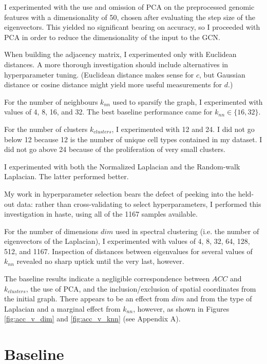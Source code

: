 \documentclass{article}
\newcommand{\nData}{1167}
\begin{document}
I experimented with the use and omission of PCA on the preprocessed genomic features with a dimensionality of 50, chosen after evaluating the step size of the eigenvectors. This yielded no significant bearing on accuracy, so I proceeded with PCA in order to reduce the dimensionality of the input to the GCN.

When building the adjacency matrix, I experimented only with Euclidean distances. A more thorough investigation should include alternatives in hyperparameter tuning. (Euclidean distance makes sense for $c$, but Gaussian distance or cosine distance might yield more useful measurements for $d$.)

For the number of neighbours $k_{nn}$ used to sparsify the graph, I experimented with values of 4, 8, 16, and 32. The best baseline performance came for $k_{nn} \in \{16,32\}$.

For the number of clusters $k_{clusters}$, I experimented with 12 and 24. I did not go below 12 because 12 is the number of unique cell types contained in my dataset. I did not go above 24 because of the proliferation of very small clusters.

I experimented with both the Normalized Laplacian and the Random-walk Laplacian. The latter performed better.

My work in hyperparameter selection bears the defect of peeking into the held-out data: rather than cross-validating to select hyperparameters, I performed this investigation in haste, using all of the \nData{} samples available.

For the number of dimensions $dim$ used in spectral clustering (i.e. the number of eigenvectors of the Laplacian), I experimented with values of 4, 8, 32, 64, 128, 512, and \nData{}. Inspection of distances between eigenvalues for several values of $k_{nn}$ revealed no sharp uptick until the very last, however.

The baseline results indicate a negligible correspondence between $ACC$ and $k_{clusters}$, the use of PCA, and the inclusion/exclusion of spatial coordinates from the initial graph. There appears to be an effect from $dim$ and from the type of Laplacian and a marginal effect from $k_{nn}$, however, as shown in Figures \ref{fig:acc_v_dim} and \ref{fig:acc_v_knn} (see Appendix A).

\section{Baseline}
\end{document}
